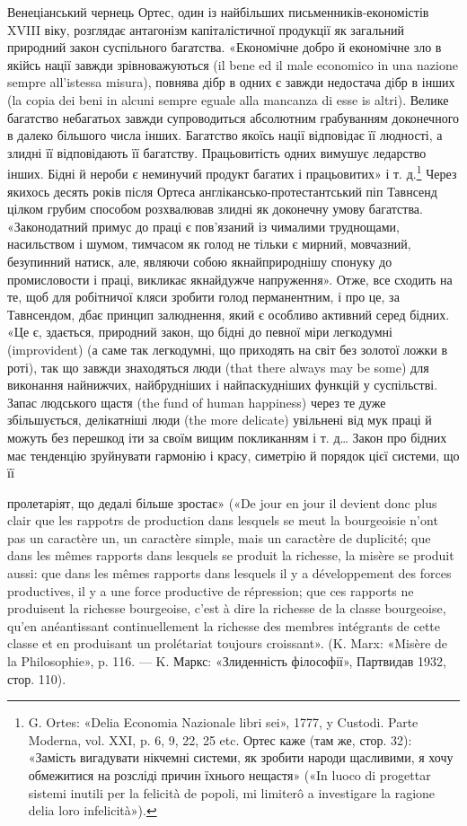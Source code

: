 Венеціанський чернець Ортес, один із найбільших письменників-економістів
XVIII віку, розглядає антагонізм капіталістичної
продукції як загальний природний закон суспільного
багатства. «Економічне добро й економічне зло в якійсь нації
завжди зрівноважуються (il bene ed il male economico in una
nazione sempre all’istessa misura), повнява дібр в одних є завжди
недостача дібр в інших (la copia dei beni in alcuni sempre eguale
alla mancanza di esse is altri). Велике багатство небагатьох завжди
супроводиться абсолютним грабуванням доконечного в далеко
більшого числа інших. Багатство якоїсь нації відповідає її людності,
а злидні її відповідають її багатству. Працьовитість одних
вимушує ледарство інших. Бідні й нероби є неминучий продукт
багатих і працьовитих» і т. д.\footnote{
G. Ortes: «Delia Economia Nazionale libri sei», 1777, y Custodi.
Parte Moderna, vol. XXI, p. 6, 9, 22, 25 etc. Ортес каже (там же, стор. 32):
«Замість вигадувати нікчемні системи, як зробити народи щасливими,
я хочу обмежитися на розсліді причин їхнього нещастя» («In luoco di
progettar sistemi inutili per la felicità de popoli, mi limiterô a investigare
la ragione delia loro infelicità»).
} Через якихось десять років
після Ортеса англікансько-протестантський піп Тавнсенд цілком
грубим способом розхвалював злидні як доконечну умову
багатства. «Законодатний примус до праці є пов’язаний із чималими
труднощами, насильством і шумом, тимчасом як голод не
тільки є мирний, мовчазний, безупинний натиск, але, являючи
собою якнайприроднішу спонуку до промисловости і праці, викликає
якнайдужче напруження». Отже, все сходить на те, щоб
для робітничої кляси зробити голод перманентним, і про це, за
Тавнсендом, дбає принцип залюднення, який є особливо активний
серед бідних. «Це є, здається, природний закон, що бідні
до певної міри легкодумні (improvident) (а саме так легкодумні,
що приходять на світ без золотої ложки в роті), так що завжди
знаходяться люди (that there always may be some) для виконання
найнижчих, найбрудніших і найпаскудніших функцій у суспільстві.
Запас людського щастя (the fund of human happiness) через
те дуже збільшується, делікатніші люди (the more delicate) увільнені
від мук праці й можуть без перешкод іти за своїм вищим
покликанням і т. д\dots{} Закон про бідних має тенденцію зруйнувати
гармонію і красу, симетрію й порядок цієї системи, що її

пролетаріят, що дедалі більше зростає» («De jour en jour il devient donc
plus clair que les rappotrs de production dans lesquels se meut la bourgeoisie
n’ont pas un caractère un, un caractère simple, mais un caractère de duplicité;
que dans les mêmes rapports dans lesquels se produit la richesse, la
misère se produit aussi: que dans les mêmes rapports dans lesquels il y a
développement des forces productives, il y a une force productive de répression;
que ces rapports ne produisent la richesse bourgeoise, c’est à dire
la richesse de la classe bourgeoise, qu’en anéantissant continuellement la
richesse des membres intégrants de cette classe et en produisant un prolétariat
toujours croissant». (K. Marx: «Misère de la Philosophie», p. 116.
— K. Маркс: «Злиденність філософії», Партвидав 1932, стор. 110).
\parbreak{}  %
